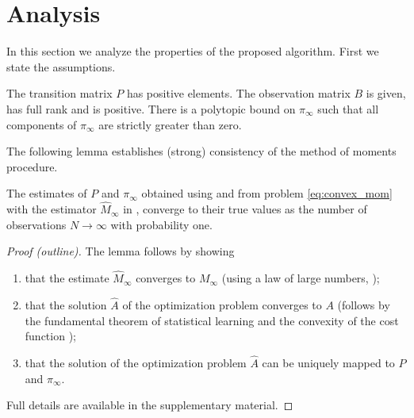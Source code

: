 \documentclass[journal]{IEEEtran}
\newcommand{\pii}{\pi_\infty}
\begin{document}

\section{Analysis}
\label{sec:analysis}

In this section we analyze the properties of the proposed algorithm. First we state the
assumptions.

\begin{assumption}
    The transition matrix $P$ has positive elements. The observation matrix $B$
    is given, has full rank and is positive. There is a polytopic bound on
    $\pii$ such that all components of $\pii$ are strictly greater than zero.
\end{assumption}

The following lemma establishes (strong) consistency of the method of moments procedure.
\begin{lemma}
    The estimates of $P$ and $\pi_\infty$ obtained using 
    and  from problem \eqref{eq:convex_mom} with the
    estimator $\hat M_\infty$ in , converge to their
    true values as the number of observations $N \rightarrow \infty$ with
    probability one.
    \label{thrm:convergence_P_pi}
\end{lemma}
\begin{proof}[Proof (outline)]
The lemma follows by showing
\begin{enumerate}
    \item that the estimate $\hat M_\infty$ converges to $M_\infty$ (using a 
        law of large numbers, \cite[Theorem 14.2.53]{cappe_inference_2005});
    \item that the solution $\hat A$ of the optimization problem converges to
        $A$ (follows by the fundamental theorem of statistical learning
        \cite[Lemma 1.1]{campi_system_2006} and the convexity of the cost
        function \cite[Theorem 10.8]{rockafellar_convex_1970});
    \item that the solution of the optimization problem $\hat A$ can be
        uniquely mapped to $P$ and $\pi_\infty$.
\end{enumerate}
Full details are available in the supplementary material.
\end{proof}
\end{document}
